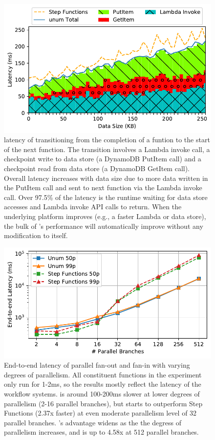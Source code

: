 \begin{figure}[t!]
  \centering
  \includegraphics[width=\columnwidth]{figures/TotalAdditionalLatencyNBreakdown.pdf}
  \caption{\name{} latency of transitioning from the completion of a funtion
    to the start of the next function. The transition involves a Lambda
    invoke call, a checkpoint write to data store (a DynamoDB PutItem call)
    and a checkpoint read from data store (a DynamoDB GetItem call). Overall
    latency increases with data size due to more data written in the PutItem
    call and sent to next function via the Lambda invoke call. Over 97.5\% of
    the latency is the
    \name{} runtime waiting for data store accesses and Lambda invoke API
    calls to return. When the underlying platform improves (e.g., a faster
    Lambda or data store), the bulk of \name{}'s performance will
    automatically improve without any modification to \name{} itself.}
  \label{fig:single-transition-latency-breakdown}
\end{figure}

\begin{figure}[t!]
  \centering
  \includegraphics[width=\columnwidth]{figures/MapMicroLatency.pdf}
  \caption{End-to-end latency of parallel fan-out and fan-in with varying
    degrees of parallelism. All constituent functions in the experiment only
    run for 1-2ms, so the results mostly reflect the latency of the workflow
    systems. \name{} is around 100-200ms slower at lower degrees of
    parallelism (2-16 parallel branches), but starts to outperform Step
    Functions (2.37x faster) at even moderate parallelism level of 32 parallel
    branches. \name{}'s advantage widens as the the degress of parallelism
    increases, and is up to 4.58x at 512 parallel branches.}
  \label{fig:mapmicrolatency}
\end{figure}

